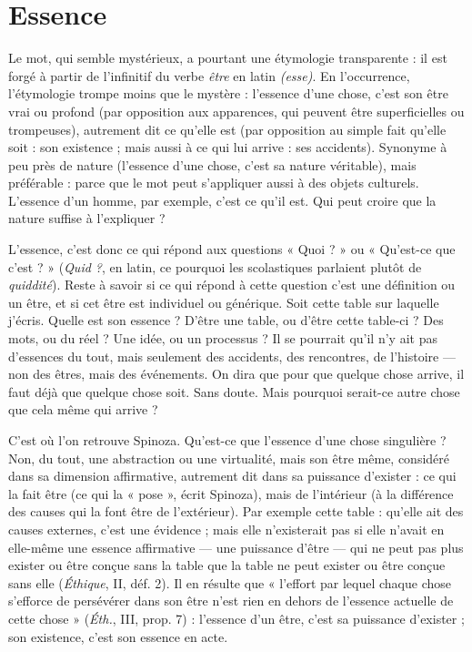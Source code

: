 \section{Essence}
Le mot, qui semble mystérieux, a pourtant une étymologie transparente :
il est forgé à partir de l’infinitif du verbe {\it être} en latin
{\it (esse)}. En l'occurrence, l’étymologie trompe moins que le mystère : l’essence
d’une chose, c’est son être vrai ou profond (par opposition aux apparences, qui
peuvent être superficielles ou trompeuses), autrement dit ce qu’elle est (par
opposition au simple fait qu’elle soit : son existence ; mais aussi à ce qui lui
arrive : ses accidents). Synonyme à peu près de nature (l'essence d’une chose,
c'est sa nature véritable), mais préférable : parce que le mot peut s’appliquer
aussi à des objets culturels. L’essence d’un homme, par exemple, c’est ce qu’il
est. Qui peut croire que la nature suffise à l'expliquer ?

L’essence, c’est donc ce qui répond aux questions « Quoi ? » ou « Qu'est-ce
que c’est ? » ({\it Quid ?}, en latin, ce pourquoi les scolastiques parlaient plutôt de
{\it quiddité}). Reste à savoir si ce qui répond à cette question c’est une définition
ou un être, et si cet être est individuel ou générique. Soit cette table sur laquelle
j'écris. Quelle est son essence ? D’être une table, ou d’être cette table-ci ? Des
mots, ou du réel ? Une idée, ou un processus ? Il se pourrait qu’il n’y ait pas
d’essences du tout, mais seulement des accidents, des rencontres, de l’histoire —
non des êtres, mais des événements. On dira que pour que quelque chose
arrive, il faut déjà que quelque chose soit. Sans doute. Mais pourquoi serait-ce
autre chose que cela même qui arrive ?

C'est où l’on retrouve Spinoza. Qu'est-ce que l’essence d’une chose
singulière ? Non, du tout, une abstraction ou une virtualité, mais son être
même, considéré dans sa dimension affirmative, autrement dit dans sa puissance
d'exister : ce qui la fait être (ce qui la « pose », écrit Spinoza), mais de
l’intérieur (à la différence des causes qui la font être de l'extérieur). Par exemple
cette table : qu’elle ait des causes externes, c’est une évidence ; mais elle n’existerait
pas si elle n’avait en elle-même une essence affirmative — une puissance
d’être — qui ne peut pas plus exister ou être conçue sans la table que la table ne
peut exister ou être conçue sans elle ({\it Éthique}, II, déf. 2). Il en résulte que
« l'effort par lequel chaque chose s’efforce de persévérer dans son être n’est rien
en dehors de l’essence actuelle de cette chose » ({\it Éth.}, III, prop. 7) : l'essence
d’un être, c’est sa puissance d’exister ; son existence, c’est son essence en acte.

